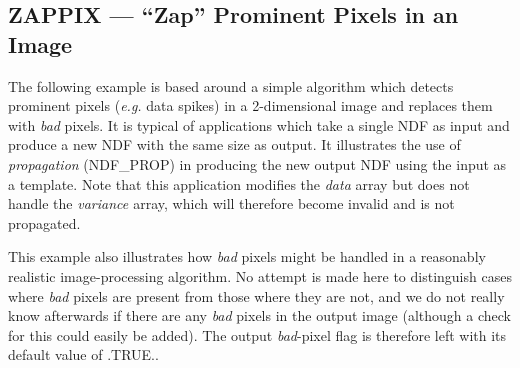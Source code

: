 \documentclass[twoside,11pt]{article}
\newcommand{\htmlref}[2]{#1}
\newcommand{\xlabel}[1]{}
\newcommand{\st}[1]{{\em{#1}}}
\begin{document}
\newpage
\subsection{\xlabel{ZAPPIX}ZAPPIX --- ``Zap'' Prominent Pixels in an Image}

The following example is based around a simple algorithm which detects prominent
pixels (\st{e.g.\/} data spikes) in a 2-dimensional image and replaces them with
\st{bad\/} pixels. It is typical of applications which take a single NDF as
input and produce a new NDF with the same size as output. It illustrates the use
of \st{propagation\/} (\htmlref{NDF\_PROP}{NDF_PROP}) in producing the new output NDF using the input
as a template. Note that this application modifies the \st{data\/} array but
does not handle the \st{variance \/} array, which will therefore become invalid
and is not propagated.

This example also illustrates how \st{bad\/} pixels might be handled in a
reasonably realistic image-processing algorithm. No attempt is made here to
distinguish cases where \st{bad\/} pixels are present from those where they are
not, and we do not really know afterwards if there are any \st{bad\/} pixels in
the output image (although a check for this could easily be added). The output
\st{bad\/}-pixel flag is therefore left with its default value of
.TRUE..
\end{document}
